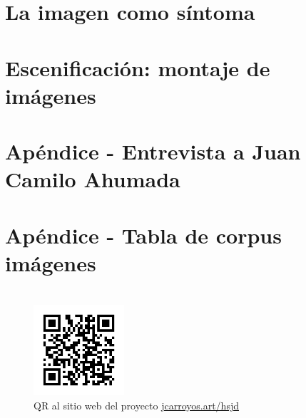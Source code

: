 \documentclass[12pt,oneside,openany]{report}
\begin{document}
\chapter{La imagen como síntoma}


\chapter{Escenificación: montaje de imágenes}



\clearpage
{}
{}
\listoffigures

\clearpage
{}
{}
\listoftables   

{}
\printbibliography[title={Bibliografía}, nottype=online]

{}
\printbibliography[title={Videografía}, type=online]


\footnotesize
\appendix
\chapter{Apéndice - Entrevista a Juan Camilo Ahumada}
\label{apendiceA}


\chapter{Apéndice - Tabla de corpus imágenes}
\label{apendiceB}

\normalsize

\chapter*{}

\begin{figure}[h!]
    \thispagestyle{empty}
    \captionsetup{labelformat=empty}
    \centering
    \includegraphics[width=0.3\textwidth]{qr_jcarroyos_research.png}
    \caption{QR al sitio web del proyecto \href{https://jcarroyos.art/docs/research/hsjd}{jcarroyos.art/hsjd}}
\end{figure}
\end{document}
